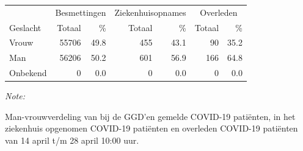 \documentclass[
  english,
  man,floatsintext]{apa6}
\begin{document}
\begin{table}
\centering\begingroup\fontsize{11}{13}\selectfont

\begin{threeparttable}
\begin{tabular}{lrrrrrr}
\toprule
\multicolumn{1}{c}{ } & \multicolumn{2}{c}{Besmettingen} & \multicolumn{2}{c}{Ziekenhuisopnames} & \multicolumn{2}{c}{Overleden} \\
\cmidrule(l{3pt}r{3pt}){2-3} \cmidrule(l{3pt}r{3pt}){4-5} \cmidrule(l{3pt}r{3pt}){6-7}
Geslacht & Totaal & \% & Totaal & \% & Totaal & \%\\
\midrule
Vrouw & 55706 & 49.8 & 455 & 43.1 & 90 & 35.2\\
Man & 56206 & 50.2 & 601 & 56.9 & 166 & 64.8\\
Onbekend & 0 & 0.0 & 0 & 0.0 & 0 & 0.0\\
\bottomrule
\end{tabular}
\begin{tablenotes}
\item \textit{Note: } 
\item Man-vrouwverdeling van bij de GGD’en gemelde COVID-19 patiënten, in het ziekenhuis opgenomen COVID-19 patiënten en overleden COVID-19 patiënten van 14 april t/m 28 april 10:00 uur.
\end{tablenotes}
\end{threeparttable}
\endgroup{}
\end{table}
\newpage
\end{document}
